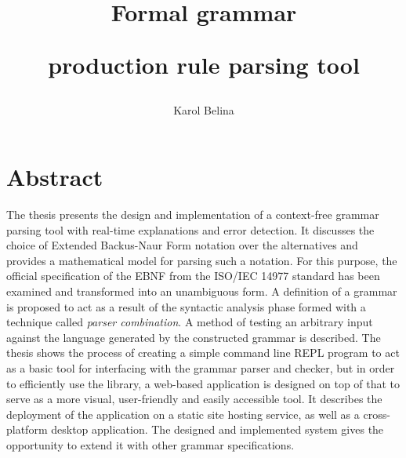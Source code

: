 \documentclass[english,engineering]{wizthesis}
\author{Karol Belina}
\title{Formal grammar\par production rule parsing tool}
\begin{document}
\frontmatter %

\maketitle

\chapter*{Abstract}

The thesis presents the design and implementation of a context-free grammar
parsing tool with real-time explanations and error detection. It discusses the
choice of Extended Backus-Naur Form notation over the alternatives and provides
a mathematical model for parsing such a notation. For this purpose, the official
specification of the EBNF from the ISO/IEC 14977 standard has been examined and
transformed into an unambiguous form. A definition of a grammar is proposed to
act as a result of the syntactic analysis phase formed with a technique called
\emph{parser combination}. A method of testing an arbitrary input against the
language generated by the constructed grammar is described. The thesis shows the
process of creating a simple command line REPL program to act as a basic tool
for interfacing with the grammar parser and checker, but in order to efficiently
use the library, a web-based application is designed on top of that to serve as
a more visual, user-friendly and easily accessible tool. It describes the
deployment of the application on a static site hosting service, as well as a
cross-platform desktop application. The designed and implemented system gives
the opportunity to extend it with other grammar specifications.
\end{document}
